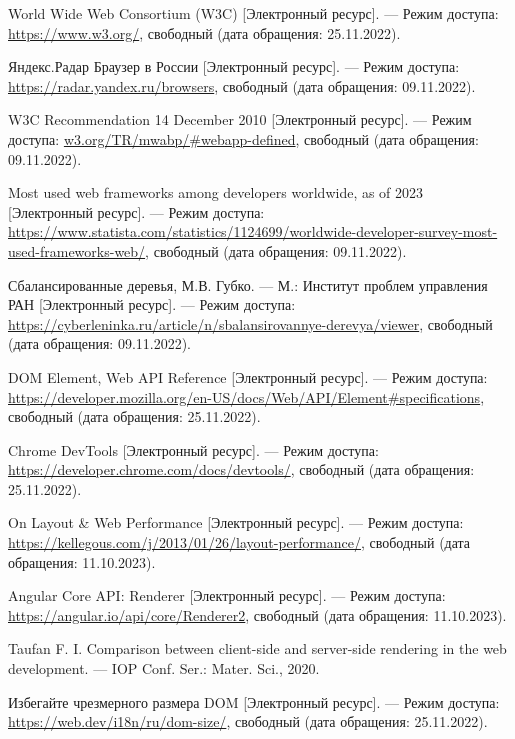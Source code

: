 \begin{thebibliography}{}
	World  Wide Web Consortium (W3C) [Электронный ресурс]. --- Режим доступа: \url{https://www.w3.org/}, свободный (дата обращения: 25.11.2022).
	
	Яндекс.Радар Браузер в России [Электронный ресурс]. --- Режим доступа:
	\url{https://radar.yandex.ru/browsers}, свободный (дата обращения: 09.11.2022).

	W3C Recommendation 14 December 2010 [Электронный ресурс]. --- Режим доступа:
	\url{w3.org/TR/mwabp/#webapp-defined}, свободный (дата обращения: 09.11.2022).

	Most used web frameworks among developers worldwide, as of 2023 [Электронный ресурс]. --- Режим доступа:
	\url{https://www.statista.com/statistics/1124699/worldwide-developer-survey-most-used-frameworks-web/}, свободный (дата обращения: 09.11.2022).
	
	Сбалансированные деревья, М.В. Губко. --- М.: Институт проблем управления РАН [Электронный ресурс]. --- Режим доступа: \url{https://cyberleninka.ru/article/n/sbalansirovannye-derevya/viewer}, свободный (дата обращения: 09.11.2022).
	
	DOM Element, Web API Reference [Электронный ресурс]. --- Режим доступа: \url{https://developer.mozilla.org/en-US/docs/Web/API/Element#specifications}, свободный (дата обращения: 25.11.2022).

	Chrome DevTools [Электронный ресурс]. --- Режим доступа: \url{https://developer.chrome.com/docs/devtools/}, свободный (дата обращения: 25.11.2022).
	
	On Layout \& Web Performance [Электронный ресурс]. --- Режим доступа: \url{https://kellegous.com/j/2013/01/26/layout-performance/}, свободный (дата обращения: 11.10.2023).

	Angular Core API: Renderer [Электронный ресурс]. --- Режим доступа: \url{https://angular.io/api/core/Renderer2}, свободный (дата обращения: 11.10.2023).

	Taufan F. I. Comparison between client-side and server-side rendering in the web development. --- IOP Conf. Ser.: Mater. Sci., 2020.
	
	Избегайте чрезмерного размера DOM [Электронный ресурс]. --- Режим доступа: \url{https://web.dev/i18n/ru/dom-size/}, свободный (дата обращения: 25.11.2022).
	

\end{thebibliography}
